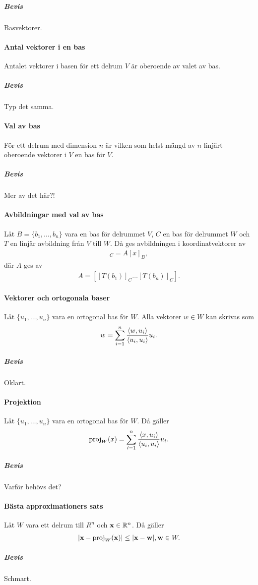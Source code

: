 \subparagraph{Bevis}
Basvektorer.

\paragraph{Antal vektorer i en bas}
Antalet vektorer i basen för ett delrum $V$ är oberoende av valet av bas.

\subparagraph{Bevis}
Typ det samma.

\paragraph{Val av bas}
För ett delrum med dimension $n$ är vilken som helst mängd av $n$ linjärt oberoende vektorer i $V$ en bas för $V$.

\subparagraph{Bevis}
Mer av det här?!

\paragraph{Avbildningar med val av bas}
Låt $B = \{b_1, \dots, b_n\}$ vara en bas för delrummet $V$, $C$ en bas för delrummet $W$ och $T$ en linjär avbildning från $V$ till $W$. Då ges avbildningen i koordinatvektorer av
\begin{align*}
	[T(x)]_C = A[x]_B,
\end{align*}
där $A$ ges av
\begin{align*}
	A = [[T(b_1)]_C \dots [T(b_n)]_C].
\end{align*}

\paragraph{Vektorer och ortogonala baser}
Låt $\{u_1, \dots, u_n\}$ vara en ortogonal bas för $W$. Alla vektorer $w\in W$ kan skrivas som
\begin{align*}
	w = \sum\limits_{i = 1}^n \frac{\expval{w, u_i}}{\expval{u_i, u_i}}u_i.
\end{align*}

\subparagraph{Bevis}
Oklart.

\paragraph{Projektion}
Låt $\{u_1, \dots, u_n\}$ vara en ortogonal bas för $W$. Då gäller
\begin{align*}
	\text{proj}_{W}(x) = \sum\limits_{i = 1}^n\frac{\expval{x, u_i}}{\expval{u_i, u_i}}u_i.
\end{align*}

\subparagraph{Bevis}
Varför behövs det?

\paragraph{Bästa approximationers sats}
Låt $W$ vara ett delrum till $R^n$ och $\vect{x}\in\R^n$. Då gäller
\begin{align*}
	\abs{\vect{x} - \proj{W}{\vect{x}}} \leq \abs{\vect{x} - \vect{w}}, \vect{w}\in W.
\end{align*}

\subparagraph{Bevis}
Schmart.